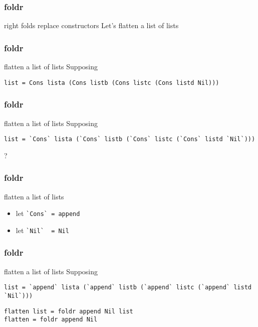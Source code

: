 %

\begin{frame}[fragile]
\frametitle{foldr}
\begin{block}{right folds replace constructors}
Let's flatten a list of lists
\end{block}
\end{frame}

\begin{frame}[fragile]
\frametitle{foldr}
\begin{block}{flatten a list of lists}
Supposing 
\begin{lstlisting}[style=haskell,basicstyle=\tiny\ttfamily,mathescape]
list = Cons lista (Cons listb (Cons listc (Cons listd Nil)))
\end{lstlisting}
\end{block}
\end{frame}

\begin{frame}[fragile]
\frametitle{foldr}
\begin{block}{flatten a list of lists}
Supposing 
\begin{lstlisting}[style=haskell,basicstyle=\tiny\ttfamily,mathescape]
list = `Cons` lista (`Cons` listb (`Cons` listc (`Cons` listd `Nil`)))
\end{lstlisting}
\end{block}
\begin{center}
\LARGE
?
\end{center}
\end{frame}

\begin{frame}[fragile]
\frametitle{foldr}
\begin{block}{flatten a list of lists}
\begin{itemize}
\item let \lstinline{`Cons` = append}
\item let \lstinline{`Nil`  = Nil}
\end{itemize}
\end{block}
\end{frame}

\begin{frame}[fragile]
\frametitle{foldr}
\begin{block}{flatten a list of lists}
Supposing
\begin{lstlisting}[style=haskell,basicstyle=\tiny\ttfamily,mathescape]
list = `append` lista (`append` listb (`append` listc (`append` listd `Nil`)))
\end{lstlisting}
\end{block}
\begin{lstlisting}[style=haskell,basicstyle=\scriptsize\ttfamily,mathescape]
flatten list = foldr append Nil list
flatten = foldr append Nil
\end{lstlisting}
\end{frame}


